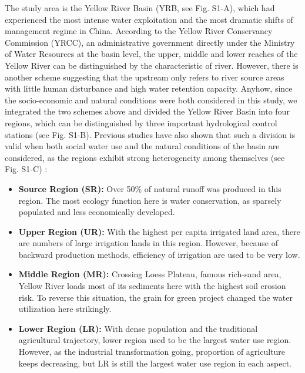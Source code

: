 \documentclass[9pt,twoside,lineno]{pnas-new}
\begin{document}
The study area is the Yellow River Basin (YRB, see Fig. S1-A), which had experienced the most intense water exploitation and the most dramatic shifts of management regime in China. 
According to the Yellow River Conservancy Commission (YRCC), an administrative government directly under the Ministry of Water Resources at the basin level, the upper, middle and lower reaches of the Yellow River can be distinguished by the characteristic of river. 
However, there is another scheme suggesting that the upstream only refers to river source areas with little human disturbance and high water retention capacity.
Anyhow, since the socio-economic and natural conditions were both considered in this study, we integrated the two schemes above and divided the Yellow River Basin into four regions, which can be distinguished by three important hydrological control stations (see Fig. S1-B). 
Previous studies have also shown that such a division is valid when both social water use and the natural conditions of the basin are considered, as the regions exhibit strong heterogeneity among themselves (see Fig. S1-C) \cite{wangYellowRiverWater2019}:

\begin{itemize}
    \item \textbf{Source Region (SR):} Over 50\% of natural runoff was produced in this region. The most ecology function here is water conservation, as sparsely populated and less economically developed.
    \item \textbf{Upper Region (UR):} With the highest per capita irrigated land area, there are numbers of large irrigation lands in this region. However, because of backward production methods, efficiency of irrigation are used to be very low.
    \item \textbf{Middle Region (MR):} Crossing Loess Plateau, famous rich-sand area, Yellow River loads most of its sediments here with the highest soil erosion risk. To reverse this situation, the grain for green project changed the water utilization here strikingly.
    \item \textbf{Lower Region (LR):} With dense population and the traditional agricultural trajectory, lower region used to be the largest water use region. However, as the industrial transformation going, proportion of agriculture keeps decreasing, but LR is still the largest water use region in each aspect.
\end{itemize}
\end{document}
